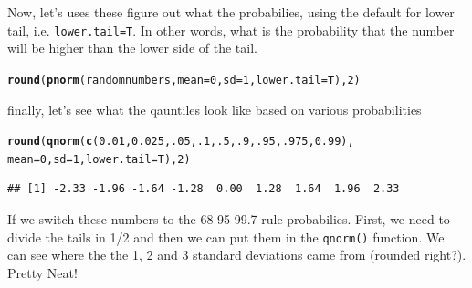 \documentclass{tufte-handout}\usepackage[]{graphicx}\usepackage[]{color}
\makeatletter
\newcommand{\hlnum}[1]{\textcolor[rgb]{0.686,0.059,0.569}{#1}}%
\newcommand{\hlstd}[1]{\textcolor[rgb]{0.345,0.345,0.345}{#1}}%
\newcommand{\hlkwc}[1]{\textcolor[rgb]{0.333,0.667,0.333}{#1}}%
\newcommand{\hlkwd}[1]{\textcolor[rgb]{0.737,0.353,0.396}{\textbf{#1}}}%
\newenvironment{kframe}{%
 \def\at@end@of@kframe{}%
 \ifinner\ifhmode%
  \def\at@end@of@kframe{\end{minipage}}%
  \begin{minipage}{\columnwidth}%
 \fi\fi%
 \def\FrameCommand##1{\hskip\@totalleftmargin \hskip-\fboxsep
 \colorbox{shadecolor}{##1}\hskip-\fboxsep
     \hskip-\linewidth \hskip-\@totalleftmargin \hskip\columnwidth}%
 \MakeFramed {\advance\hsize-\width
   \@totalleftmargin\z@ \linewidth\hsize
   \@setminipage}}%
 {\par\unskip\endMakeFramed%
 \at@end@of@kframe}
\newenvironment{knitrout}{}{} %
\makeatother
\begin{document}
Now, let's uses these figure out what the probabilies, using the default for lower tail, i.e. \texttt{lower.tail=T}. In other words, what is the probability that the number will be higher than the lower side of the tail. 

\begin{knitrout}
\color{fgcolor}\begin{kframe}
\begin{alltt}
\hlkwd{round}\hlstd{(}\hlkwd{pnorm}\hlstd{(randomnumbers,} \hlkwc{mean}\hlstd{=}\hlnum{0}\hlstd{,} \hlkwc{sd}\hlstd{=}\hlnum{1}\hlstd{,} \hlkwc{lower.tail}\hlstd{=T),} \hlnum{2}\hlstd{)}
\end{alltt}


{\ttfamily\noindent\bfseries\color{errorcolor}{\#\# Error in pnorm(randomnumbers, mean = 0, sd = 1, lower.tail = T): object 'randomnumbers' not found}}\end{kframe}
\end{knitrout}

finally, let's see what the qauntiles look like based on various probabilities

\begin{knitrout}
\color{fgcolor}\begin{kframe}
\begin{alltt}
\hlkwd{round}\hlstd{(}\hlkwd{qnorm}\hlstd{(}\hlkwd{c}\hlstd{(}\hlnum{0.01}\hlstd{,} \hlnum{0.025}\hlstd{,} \hlnum{.05}\hlstd{,} \hlnum{.1}\hlstd{,} \hlnum{.5}\hlstd{,} \hlnum{.9}\hlstd{,} \hlnum{.95}\hlstd{,} \hlnum{.975}\hlstd{,} \hlnum{0.99}\hlstd{),}
            \hlkwc{mean}\hlstd{=}\hlnum{0}\hlstd{,} \hlkwc{sd}\hlstd{=}\hlnum{1}\hlstd{,} \hlkwc{lower.tail}\hlstd{=T),} \hlnum{2}\hlstd{)}
\end{alltt}
\begin{verbatim}
## [1] -2.33 -1.96 -1.64 -1.28  0.00  1.28  1.64  1.96  2.33
\end{verbatim}
\end{kframe}
\end{knitrout}

If we switch these numbers to the 68-95-99.7 rule probabilies. First, we need to divide the tails in 1/2 and then we can put them in the \texttt{qnorm()} function. We can see where the the 1, 2 and 3 standard deviations came from (rounded right?). Pretty Neat!
\end{document}
